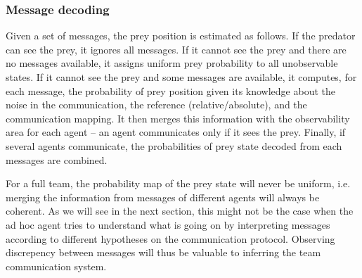 \subsubsection*{Message decoding}

Given a set of messages, the prey position is estimated as follows. If the predator can see the prey, it ignores all messages. If it cannot see the prey and there are no messages available, it assigns uniform prey probability to all unobservable states.  If it cannot see the prey and some messages are available, it computes, for each message, the probability of prey position given its knowledge about the noise in the communication, the reference (relative/absolute), and the communication mapping. It then merges this information with the observability area for each agent -- an agent communicates only if it sees the prey. Finally, if several agents communicate, the probabilities of prey state decoded from each messages are combined.%

For a full team, the probability map of the prey state will never be uniform, i.e.  merging the information from messages of different agents will always be coherent. As we will see in the next section, this might not be the case when the ad hoc agent tries to understand what is going on by interpreting messages according to different hypotheses on the communication protocol. Observing discrepency between messages will thus be valuable to inferring the team communication system.%
